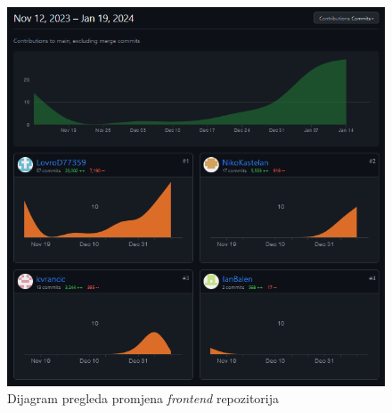 		\begin{figure}[h]
		    \centering
 		   \includegraphics[width=\textwidth]{slike/frontendGitHub.png} 
		    \caption{Dijagram pregleda promjena \textit{frontend} repozitorija}
 		   \label{fig:my_image}
		\end{figure}

